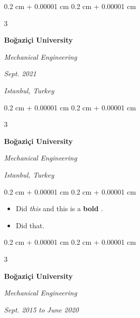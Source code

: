 \documentclass[10pt, letterpaper]{article}
\newenvironment{highlights}{
    \begin{itemize}[
        topsep=0.10 cm,
        parsep=0.10 cm,
        partopsep=0pt,
        itemsep=0pt,
        leftmargin=0.4 cm + 10pt + 0.6 cm
    ]
}{
    \end{itemize}
} %
\newenvironment{onecolentry}{
    \begin{adjustwidth}{
        0.2 cm + 0.00001 cm
    }{
        0.2 cm + 0.00001 cm
    }
}{
    \end{adjustwidth}
} %
\newenvironment{threecolentry}[3][]{
    \onecolentry
    \def\thirdColumn{#3}
    \setcolumnwidth{0.6 cm, \fill, 4.5 cm}
    \begin{paracol}{3}
    #2 \switchcolumn
}{
    \switchcolumn \raggedleft \thirdColumn
    \end{paracol}
    \endonecolentry
} %
\let\hrefWithoutArrow\href
\renewcommand{\href}[2]{\hrefWithoutArrow{#1}{\mbox{\ifthenelse{\equal{#2}{}}{ }{#2 }\raisebox{.15ex}{\footnotesize \faExternalLink*}}}}
\begin{document}
        \vspace{0.2 cm}

        \begin{threecolentry}{
            \vspace*{\fill}
            \textbullet
            \vspace*{3px}
            \vspace*{\fill}
        }{
        \textit{Sept. 2021}
            
        \textit{Istanbul, Turkey}}
            \textbf{Boğaziçi University}

            \textit{Mechanical Engineering}
        \end{threecolentry}



        \vspace{0.2 cm}

        \begin{threecolentry}{
            \vspace*{\fill}
            \textbullet
            \vspace*{3px}
            \vspace*{\fill}
        }{

            
        \textit{Istanbul, Turkey}}
            \textbf{Boğaziçi University}

            \textit{Mechanical Engineering}
        \end{threecolentry}

        \vspace{0.10 cm}
        \begin{onecolentry}
            \begin{highlights}
                \item Did \textit{this} and this is a \textbf{bold} \href{https://example.com}{link}.
                \item Did that.
            \end{highlights}
        \end{onecolentry}


        \vspace{0.2 cm}

        \begin{threecolentry}{
            \vspace*{\fill}
            \textbullet
            \vspace*{3px}
            \vspace*{\fill}
        }{
        \textit{Sept. 2015 to June 2020}
            
        }
            \textbf{Boğaziçi University}

            \textit{Mechanical Engineering}
        \end{threecolentry}
\end{document}
